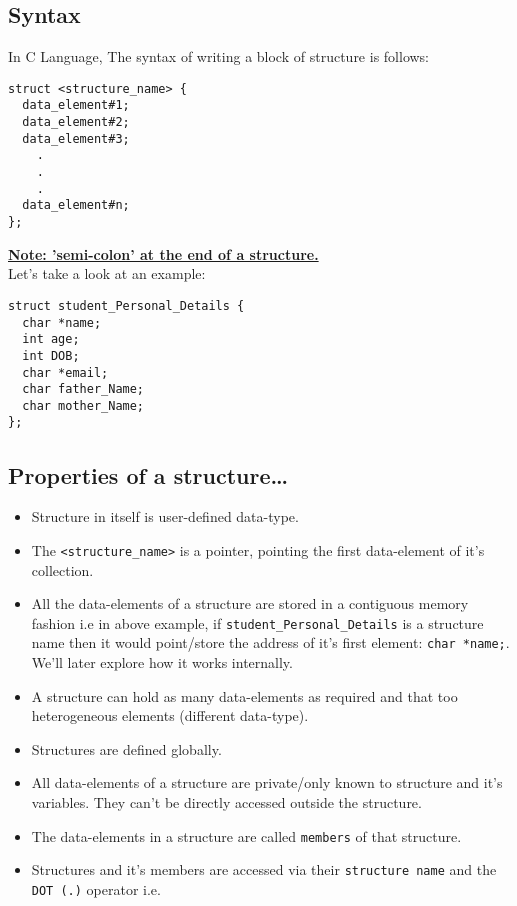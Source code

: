 \documentclass[11pt]{article}
\begin{document}
\subsection{Syntax}
\label{sec:org7372b4c}

In C Language, The syntax of writing a block of structure is follows:

\begin{verbatim}
struct <structure_name> {
  data_element#1;
  data_element#2;
  data_element#3;
    .
    .
    .
  data_element#n;
};
\end{verbatim}

\uline{\textbf{Note: ’semi-colon’ at the end of a structure.}}\\
Let’s take a look at an example:

\begin{verbatim}
struct student_Personal_Details {
  char *name;
  int age;
  int DOB;
  char *email;
  char father_Name;
  char mother_Name;
};
\end{verbatim}

\subsection{Properties of a structure…}
\label{sec:org8d114ef}
\begin{itemize}
\item Structure in itself is user-defined data-type.
\item The \texttt{<structure\_name>} is a pointer, pointing the first data-element of
it’s collection.
\item All the data-elements of a structure are stored in a contiguous memory fashion
i.e in above example, if \texttt{student\_Personal\_Details} is a structure name then it would
point/store the address of it’s first element: \texttt{char *name;}. We’ll later
explore how it works internally.
\item A structure can hold as many data-elements as required and that too
heterogeneous elements (different data-type).
\item Structures are defined globally.
\item All data-elements of a structure are private/only known to structure and
it’s variables. They can’t be directly accessed outside the structure.
\item The data-elements in a structure are called \texttt{members} of that structure.
\item Structures and it’s members are accessed via their \texttt{structure name} and the
\texttt{DOT (.)} operator i.e.
\end{itemize}
\end{document}
